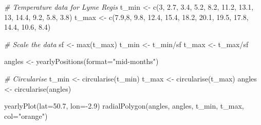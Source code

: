 \documentclass[
]{book}
\newenvironment{Shaded}{\begin{snugshade}}{\end{snugshade}}
\newcommand{\AttributeTok}[1]{\textcolor[rgb]{0.77,0.63,0.00}{#1}}
\newcommand{\CommentTok}[1]{\textcolor[rgb]{0.56,0.35,0.01}{\textit{#1}}}
\newcommand{\DecValTok}[1]{\textcolor[rgb]{0.00,0.00,0.81}{#1}}
\newcommand{\FloatTok}[1]{\textcolor[rgb]{0.00,0.00,0.81}{#1}}
\newcommand{\FunctionTok}[1]{\textcolor[rgb]{0.00,0.00,0.00}{#1}}
\newcommand{\NormalTok}[1]{#1}
\newcommand{\OtherTok}[1]{\textcolor[rgb]{0.56,0.35,0.01}{#1}}
\newcommand{\SpecialCharTok}[1]{\textcolor[rgb]{0.00,0.00,0.00}{#1}}
\newcommand{\StringTok}[1]{\textcolor[rgb]{0.31,0.60,0.02}{#1}}
\begin{document}
\begin{Shaded}
\begin{Highlighting}[]
\CommentTok{\# Temperature data for Lyme Regis}
\NormalTok{t\_min }\OtherTok{\textless{}{-}} \FunctionTok{c}\NormalTok{(}\DecValTok{3}\NormalTok{, }\FloatTok{2.7}\NormalTok{, }\FloatTok{3.4}\NormalTok{, }\FloatTok{5.2}\NormalTok{, }\FloatTok{8.2}\NormalTok{, }\FloatTok{11.2}\NormalTok{, }\FloatTok{13.1}\NormalTok{, }\DecValTok{13}\NormalTok{, }\FloatTok{14.4}\NormalTok{, }\FloatTok{9.2}\NormalTok{, }\FloatTok{5.8}\NormalTok{, }\FloatTok{3.8}\NormalTok{)}
\NormalTok{t\_max }\OtherTok{\textless{}{-}} \FunctionTok{c}\NormalTok{(}\FloatTok{7.9}\NormalTok{,}\DecValTok{8}\NormalTok{, }\FloatTok{9.8}\NormalTok{, }\FloatTok{12.4}\NormalTok{, }\FloatTok{15.4}\NormalTok{, }\FloatTok{18.2}\NormalTok{, }\FloatTok{20.1}\NormalTok{, }\FloatTok{19.5}\NormalTok{, }\FloatTok{17.8}\NormalTok{, }\FloatTok{14.4}\NormalTok{, }\FloatTok{10.6}\NormalTok{, }\FloatTok{8.4}\NormalTok{)}

\CommentTok{\# Scale the data}
\NormalTok{sf }\OtherTok{\textless{}{-}} \FunctionTok{max}\NormalTok{(t\_max)}
\NormalTok{t\_min }\OtherTok{\textless{}{-}}\NormalTok{ t\_min}\SpecialCharTok{/}\NormalTok{sf}
\NormalTok{t\_max }\OtherTok{\textless{}{-}}\NormalTok{ t\_max}\SpecialCharTok{/}\NormalTok{sf}

\NormalTok{angles }\OtherTok{\textless{}{-}} \FunctionTok{yearlyPositions}\NormalTok{(}\AttributeTok{format=}\StringTok{"mid{-}months"}\NormalTok{)}

\CommentTok{\# Circularise}
\NormalTok{t\_min }\OtherTok{\textless{}{-}} \FunctionTok{circularise}\NormalTok{(t\_min)}
\NormalTok{t\_max }\OtherTok{\textless{}{-}} \FunctionTok{circularise}\NormalTok{(t\_max)}
\NormalTok{angles }\OtherTok{\textless{}{-}} \FunctionTok{circularise}\NormalTok{(angles)}

\FunctionTok{yearlyPlot}\NormalTok{(}\AttributeTok{lat=}\FloatTok{50.7}\NormalTok{, }\AttributeTok{lon=}\SpecialCharTok{{-}}\FloatTok{2.9}\NormalTok{)}
\FunctionTok{radialPolygon}\NormalTok{(angles, angles, t\_min, t\_max, }\AttributeTok{col=}\StringTok{"orange"}\NormalTok{)}
\end{Highlighting}
\end{Shaded}
\end{document}
